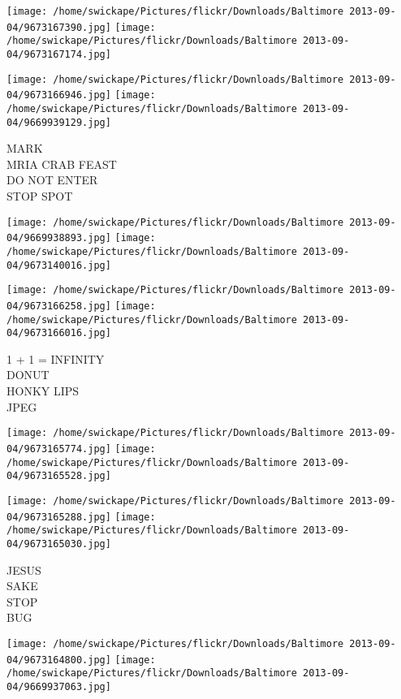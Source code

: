\documentclass[10pt,letterpaper]{article}
\begin{document}
\texttt{[image: /home/swickape/Pictures/flickr/Downloads/Baltimore 2013-09-04/9673167390.jpg]}
\texttt{[image: /home/swickape/Pictures/flickr/Downloads/Baltimore 2013-09-04/9673167174.jpg]}

\texttt{[image: /home/swickape/Pictures/flickr/Downloads/Baltimore 2013-09-04/9673166946.jpg]}
\texttt{[image: /home/swickape/Pictures/flickr/Downloads/Baltimore 2013-09-04/9669939129.jpg]}

MARK\\
MRIA CRAB FEAST\\
DO NOT ENTER\\
STOP SPOT\\
\pagebreak

\texttt{[image: /home/swickape/Pictures/flickr/Downloads/Baltimore 2013-09-04/9669938893.jpg]}
\texttt{[image: /home/swickape/Pictures/flickr/Downloads/Baltimore 2013-09-04/9673140016.jpg]}

\texttt{[image: /home/swickape/Pictures/flickr/Downloads/Baltimore 2013-09-04/9673166258.jpg]}
\texttt{[image: /home/swickape/Pictures/flickr/Downloads/Baltimore 2013-09-04/9673166016.jpg]}

1 + 1 = INFINITY\\
DONUT\\
HONKY LIPS\\
JPEG\\
\pagebreak

\texttt{[image: /home/swickape/Pictures/flickr/Downloads/Baltimore 2013-09-04/9673165774.jpg]}
\texttt{[image: /home/swickape/Pictures/flickr/Downloads/Baltimore 2013-09-04/9673165528.jpg]}

\texttt{[image: /home/swickape/Pictures/flickr/Downloads/Baltimore 2013-09-04/9673165288.jpg]}
\texttt{[image: /home/swickape/Pictures/flickr/Downloads/Baltimore 2013-09-04/9673165030.jpg]}

JESUS\\
SAKE\\
STOP\\
BUG\\
\pagebreak

\texttt{[image: /home/swickape/Pictures/flickr/Downloads/Baltimore 2013-09-04/9673164800.jpg]}
\texttt{[image: /home/swickape/Pictures/flickr/Downloads/Baltimore 2013-09-04/9669937063.jpg]}
\end{document}
